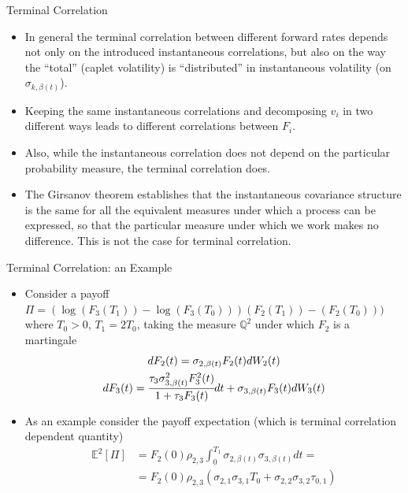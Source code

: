 \documentclass{beamer}
\begin{document}
\begin{frame}{Terminal Correlation}
\begin{itemize}
\item In general the terminal correlation between different forward rates depends not only on the introduced instantaneous correlations, but also on the way the “total” (caplet volatility) is “distributed” in instantaneous volatility (on $\sigma_{k,\beta(t)}$).
\item Keeping the same instantaneous correlations and decomposing $v_i$ in two different ways leads to different correlations between $F_i$. 
\item Also, while the instantaneous correlation does not depend on the particular probability measure, the terminal correlation does. 
\item The Girsanov theorem establishes that the instantaneous covariance structure is the same for all the equivalent measures under which a process can be expressed, so that the particular measure under which we work makes no difference. This is not the case for terminal correlation. 
\end{itemize}
\end{frame}

\begin{frame}{Terminal Correlation: an Example}
\begin{itemize}
\item Consider a payoff $\Pi = (\log(F_3(T_1))-\log(F_3(T_0)))(F_2(T_1))-(F_2(T_0)))$ where $T_0>0$, $T_1=2T_0$, taking the measure $\mathbb{Q}^2$ under which $F_2$ is a martingale
\begin{equation*}
\begin{gathered}
dF_2(t) = \sigma_{2,\beta(t)}F_2(t)dW_2(t)\\
dF_3(t) = \cfrac{\tau_3\sigma^2_{3,\beta(t)}F_3^2(t)}{1+\tau_3F_3(t)}dt + \sigma_{3,\beta(t)}F_3(t)dW_3(t)
\end{gathered}
\end{equation*}
\item As an example consider the payoff expectation (which is terminal correlation dependent quantity)
\begin{equation}
\begin{aligned}
\mathbb{E}^2[\Pi] & = F_2(0)\rho_{2,3}\int_0^{T_1}\sigma_{2,\beta(t)}\sigma_{3,\beta(t)}dt = \\
&  = F_2(0)\rho_{2,3}(\sigma_{2,1}\sigma_{3,1}T_0+\sigma_{2,2}\sigma_{3,2}\tau_{0,1})
\end{aligned}
\label{eq:terminal_correlation_ex}
\end{equation}
\end{itemize}
\end{frame}
\end{document}
